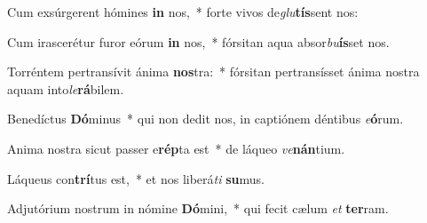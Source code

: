\item Cum exsúrgerent hómines \textbf{in} nos,~* forte vivos de\textit{glu}\textbf{tís}sent nos:
\item Cum irascerétur furor eórum \textbf{in} nos,~* fórsitan aqua absor\textit{bu}\textbf{ís}set nos.
\item Torréntem pertransívit ánima \textbf{nos}tra:~* fórsitan pertransísset ánima nostra aquam into\textit{le}\textbf{rá}bilem.
\item Benedíctus \textbf{Dó}minus~* qui non dedit nos, in captiónem déntibus \textit{e}\textbf{ó}rum.
\item Anima nostra sicut passer e\textbf{rép}ta est~* de láqueo \textit{ve}\textbf{nán}tium.
\item Láqueus con\textbf{trí}tus est,~* et nos liberá\textit{ti} \textbf{su}mus.
\item Adjutórium nostrum in nómine \textbf{Dó}mini,~* qui fecit cælum \textit{et} \textbf{ter}ram.
